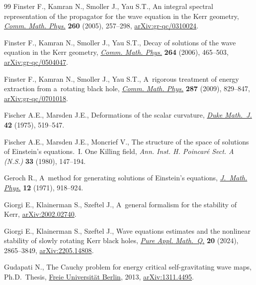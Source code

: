 \documentclass[11pt]{article}
\numberwithin{equation}{section}
\numberwithin{equation}{section}
\begin{document}
\begin{thebibliography}{99}
Finster F., Kamran N., Smoller J., Yau S.T., An integral spectral
 representation of the propagator for the wave equation in the {K}err
 geometry, \href{https://doi.org/10.1007/s00220-005-1390-x}{\textit{Comm.
 Math. Phys.}} \textbf{260} (2005), 257--298,
 \href{http://arxiv.org/abs/gr-qc/0310024}{arXiv:gr-qc/0310024}.

Finster F., Kamran N., Smoller J., Yau S.T., Decay of solutions of the wave
 equation in the {K}err geometry,
 \href{https://doi.org/10.1007/s00220-006-1525-8}{\textit{Comm. Math. Phys.}}
 \textbf{264} (2006), 465--503,
 \href{http://arxiv.org/abs/gr-qc/0504047}{arXiv:gr-qc/0504047}.

Finster F., Kamran N., Smoller J., Yau S.T., A~rigorous treatment of energy
 extraction from a~rotating black hole,
 \href{https://doi.org/10.1007/s00220-009-0730-7}{\textit{Comm. Math. Phys.}}
 \textbf{287} (2009), 829--847,
 \href{http://arxiv.org/abs/gr-qc/0701018}{arXiv:gr-qc/0701018}.

Fischer A.E., Marsden J.E., Deformations of the scalar curvature,
 \href{https://doi.org/10.1215/S0012-7094-75-04249-0}{\textit{Duke Math.~J.}}
 \textbf{42} (1975), 519--547.

Fischer A.E., Marsden J.E., Moncrief V., The structure of the space of
 solutions of {E}instein's equations.~{I}. {O}ne {K}illing field, \textit{Ann.
 Inst. H. Poincar\'e Sect. A (N.S.)} \textbf{33} (1980), 147--194.

Geroch R., A~method for generating solutions of {E}instein's equations,
 \href{https://doi.org/10.1063/1.1665681}{\textit{J.~Math. Phys.}} \textbf{12}
 (1971), 918--924.

Giorgi E., Klainerman S., Szeftel J., A~general formalism for the stability of
 {K}err, \href{http://arxiv.org/abs/2002.02740}{arXiv:2002.02740}.

Giorgi E., Klainerman S., Szeftel J., Wave equations estimates and the
 nonlinear stability of slowly rotating {K}err black holes,
 \href{https://doi.org/10.4310/pamq.241128023033}{\textit{Pure Appl.
 Math.~Q.}} \textbf{20} (2024), 2865--3849,
 \href{http://arxiv.org/abs/2205.14808}{arXiv:2205.14808}.

Gudapati N., The {C}auchy problem for energy critical self-gravitating wave maps, Ph.D.~Thesis, \href{http://doi.org/10.17169/refubium-6002}{{F}reie Universit\"at Berlin}, 2013, \href{http://arxiv.org/abs/1311.4495}{arXiv:1311.4495}.


\end{thebibliography}
\end{document}
